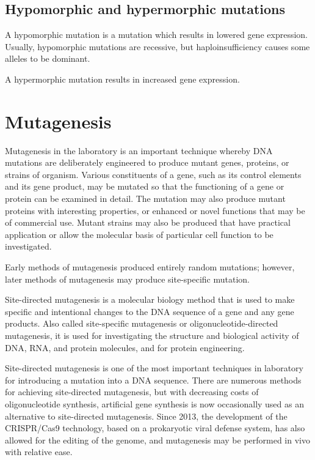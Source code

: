 \hypertarget{hypomorphic-and-hypermorphic-mutations}{%
\subsection{Hypomorphic and hypermorphic mutations}\label{hypomorphic-and-hypermorphic-mutations}}

A hypomorphic mutation is a mutation which results in lowered gene expression. Usually, hypomorphic mutations are recessive, but haploinsufficiency causes some alleles to be dominant.

A hypermorphic mutation results in increased gene expression.

\hypertarget{mutagenesis}{%
\section{Mutagenesis}\label{mutagenesis}}

Mutagenesis in the laboratory is an important technique whereby DNA mutations are deliberately engineered to produce mutant genes, proteins, or strains of organism. Various constituents of a gene, such as its control elements and its gene product, may be mutated so that the functioning of a gene or protein can be examined in detail. The mutation may also produce mutant proteins with interesting properties, or enhanced or novel functions that may be of commercial use. Mutant strains may also be produced that have practical application or allow the molecular basis of particular cell function to be investigated.

Early methods of mutagenesis produced entirely random mutations; however, later methods of mutagenesis may produce site-specific mutation.

Site-directed mutagenesis is a molecular biology method that is used to make specific and intentional changes to the DNA sequence of a gene and any gene products. Also called site-specific mutagenesis or oligonucleotide-directed mutagenesis, it is used for investigating the structure and biological activity of DNA, RNA, and protein molecules, and for protein engineering.

Site-directed mutagenesis is one of the most important techniques in laboratory for introducing a mutation into a DNA sequence. There are numerous methods for achieving site-directed mutagenesis, but with decreasing costs of oligonucleotide synthesis, artificial gene synthesis is now occasionally used as an alternative to site-directed mutagenesis. Since 2013, the development of the CRISPR/Cas9 technology, based on a prokaryotic viral defense system, has also allowed for the editing of the genome, and mutagenesis may be performed in vivo with relative ease.

